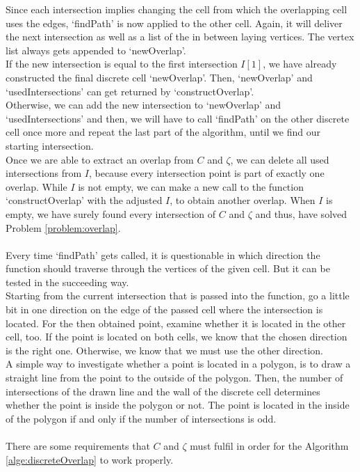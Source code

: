 \documentclass[a4paper,12pt,leqno]{article}
\theoremstyle{plain}
\theoremstyle{remark}
\begin{document}
Since each intersection implies changing the cell from which the overlapping cell uses the edges, `findPath' is now applied to the other cell. Again, it will deliver the next intersection as well as a list of the in between laying vertices. The vertex list always gets appended to `newOverlap'. \\
If the new intersection is equal to the first intersection $I[1]$, we have already constructed the final discrete cell `newOverlap'. Then, `newOverlap' and `usedIntersections' can get returned by `constructOverlap'. \\
Otherwise, we can add the new intersection to `newOverlap' and `usedIntersections' and then, we will have to call `findPath' on the other discrete cell once more and repeat the last part of the algorithm, until we find our starting intersection. \\
Once we are able to extract an overlap from $C$ and $\zeta$, we can delete all used intersections from $I$, because every intersection point is part of exactly one overlap. While $I$ is not empty, we can make a new call to the function `constructOverlap' with the adjusted $I$, to obtain another overlap. When $I$ is empty, we have surely found every intersection of $C$ and $\zeta$ and thus, have solved Problem \ref{problem:overlap}. \\
\smallskip \\
Every time `findPath' gets called, it is questionable in which direction the function should traverse through the vertices of the given cell. But it can be tested in the succeeding way. \\
Starting from the current intersection that is passed into the function, go a little bit in one direction on the edge of the passed cell where the intersection is located. For the then obtained point, examine whether it is located in the other cell, too. If the point is located on both cells, we know that the chosen direction is the right one. Otherwise, we know that we must use the other direction. \\ 
A simple way to investigate whether a point is located in a polygon, is to draw a straight line from the point to the outside of the polygon. Then, the number of intersections of the drawn line and the wall of the discrete cell determines whether the point is inside the polygon or not. The point is located in the inside of the polygon if and only if the number of intersections is odd. \\ 
\smallskip  \\
There are some requirements that $C$ and $\zeta$ must fulfil in order for the Algorithm \ref{alge:discreteOverlap} to work properly. \\
\end{document}
